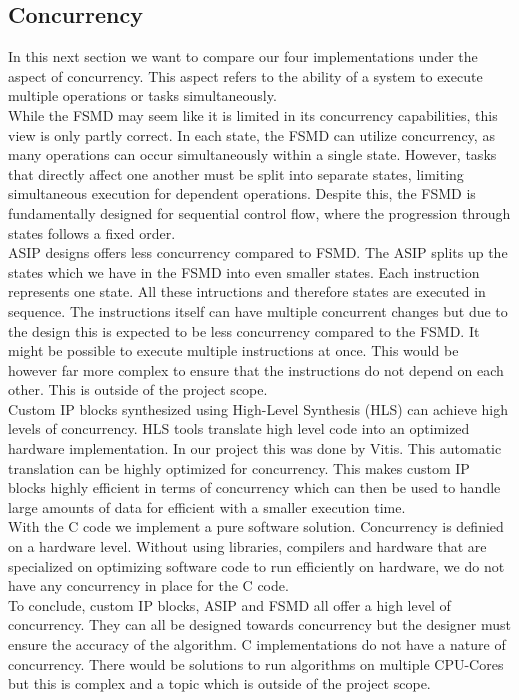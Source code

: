 \documentclass[conference]{IEEEtran}
\begin{document}
\subsection{Concurrency}
In this next section we want to compare our four implementations under the aspect of concurrency. This aspect refers to the ability of a system to execute multiple operations or tasks simultaneously.\\
While the FSMD may seem like it is limited in its concurrency capabilities, this view is only partly correct. In each state, the FSMD can utilize concurrency, as many operations can occur simultaneously within a single state. However, tasks that directly affect one another must be split into separate states, limiting simultaneous execution for dependent operations. Despite this, the FSMD is fundamentally designed for sequential control flow, where the progression through states follows a fixed order.\\
ASIP designs offers less concurrency compared to FSMD. The ASIP splits up the states which we have in the FSMD into even smaller states. Each instruction represents one state. All these intructions and therefore states are executed in sequence. The instructions itself can have multiple concurrent changes but due to the design this is expected to be less concurrency compared to the FSMD. It might be possible to execute multiple instructions at once. This would be however far more complex to ensure that the instructions do not depend on each other. This is outside of the project scope. \\
Custom IP blocks synthesized using High-Level Synthesis (HLS) can achieve high levels of concurrency. HLS tools translate high level code into an optimized hardware implementation. In our project this was done by Vitis. This automatic translation can be highly optimized for concurrency. This makes custom IP blocks highly efficient in terms of concurrency which can then be used to handle large amounts of data for efficient with a smaller execution time.\\
With the C code we implement a pure software solution. Concurrency is definied on a hardware level. Without using libraries, compilers and hardware that are specialized on optimizing software code to run efficiently on hardware, we do not have any concurrency in place for the C code.\\
To conclude, custom IP blocks, ASIP and FSMD all offer a high level of concurrency. They can all be designed towards concurrency but the designer must ensure the accuracy of the algorithm. C implementations do not have a nature of concurrency. There would be solutions to run algorithms on multiple CPU-Cores but this is complex and a topic which is outside of the project scope.\\
\end{document}
